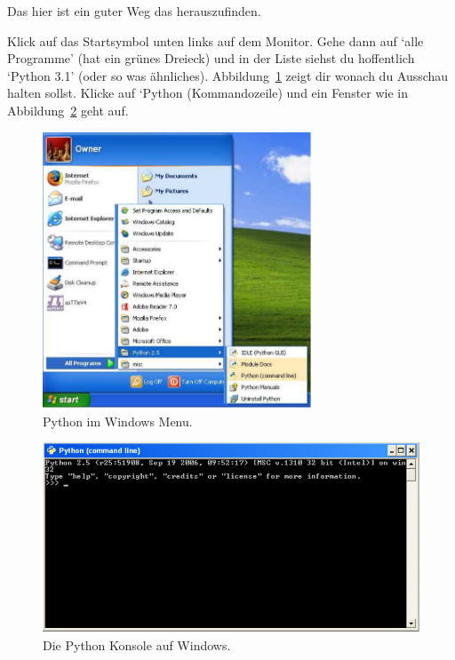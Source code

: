 \noindent
Das hier ist ein guter Weg das herauszufinden.

\begin{WINDOWS}
Klick auf das Startsymbol unten links auf dem Monitor. Gehe dann auf `alle Programme' (hat ein grünes Dreieck) und in der Liste siehst du hoffentlich `Python 3.1' (oder so was ähnliches). Abbildung~\ref{fig1} zeigt dir wonach du Ausschau halten sollst. Klicke auf `Python (Kommandozeile) und ein Fenster wie in Abbildung~\ref{fig2} geht auf.

\begin{figure}
\begin{center}
\includegraphics[width=80mm]{images/figure1}
\end{center}
\caption{Python im Windows Menu.}\label{fig1}
\end{figure}

\begin{figure}
\begin{center}
\includegraphics[width=135mm]{images/figure2}
\end{center}
\caption{Die Python Konsole auf Windows.}\label{fig2}
\end{figure}
\end{WINDOWS}

